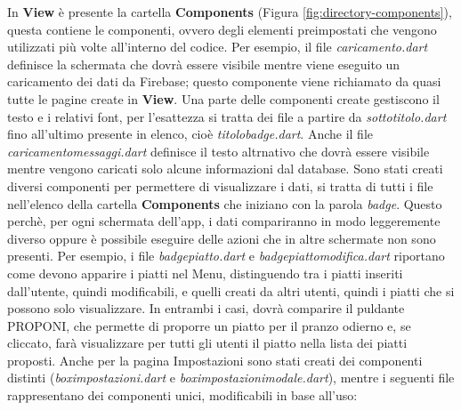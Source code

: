 In \textbf{View} è presente la cartella \textbf{Components} (Figura \ref{fig:directory-components}), questa contiene le componenti, ovvero degli elementi preimpostati che vengono utilizzati più volte all'interno del codice.\newline
Per esempio, il file \emph{caricamento.dart} definisce la schermata che dovrà essere visibile mentre viene eseguito un caricamento dei dati da Firebase; questo componente viene richiamato da quasi tutte le pagine create in \textbf{View}.\newline
\newline
Una parte delle componenti create gestiscono il testo e i relativi font, per l'esattezza si tratta dei file a partire da \emph{sottotitolo.dart} fino all'ultimo presente in elenco, cioè \emph{titolo\textunderscore badge.dart}.\newline
Anche il file \emph{caricamento\textunderscore messaggi.dart} definisce il testo altrnativo che dovrà essere visibile mentre vengono caricati solo alcune informazioni dal database.\newline
\newline
Sono stati creati diversi componenti per permettere di visualizzare i dati, si tratta di tutti i file nell'elenco della cartella \textbf{Components} che iniziano con la parola \emph{badge}.\newline
Questo perchè, per ogni schermata dell'app, i dati compariranno in modo leggeremente diverso oppure è possibile eseguire delle azioni che in altre schermate non sono presenti.\newline
Per esempio, i file \emph{badge\textunderscore piatto.dart} e \emph{badge\textunderscore piatto\textunderscore modifica.dart} riportano come devono apparire i piatti nel Menu, distinguendo tra i piatti inseriti dall'utente, quindi modificabili, e quelli creati da altri utenti, quindi i piatti che si possono solo visualizzare.\newline
In entrambi i casi, dovrà comparire il puldante PROPONI, che permette di proporre un piatto per il pranzo odierno e, se cliccato, farà visualizzare per tutti gli utenti il piatto nella lista dei piatti proposti.\newline
\newline
Anche per la pagina Impostazioni sono stati creati dei componenti distinti\newline
(\emph{box\textunderscore impostazioni.dart} e \emph{box\textunderscore impostazioni\textunderscore modale.dart}), mentre i seguenti file rappresentano dei componenti unici, modificabili in base all'uso:
